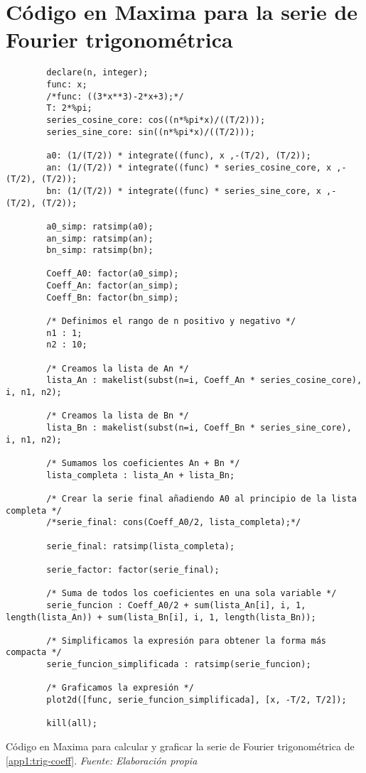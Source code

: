 \section{Código en Maxima para la serie de Fourier trigonométrica}\label{app2:trig-code-maxima}
\begin{longlisting}
	\begin{verbatim}
		declare(n, integer);
		func: x;
		/*func: ((3*x**3)-2*x+3);*/
		T: 2*%pi;
		series_cosine_core: cos((n*%pi*x)/((T/2)));
		series_sine_core: sin((n*%pi*x)/((T/2)));
		
		a0: (1/(T/2)) * integrate((func), x ,-(T/2), (T/2));
		an: (1/(T/2)) * integrate((func) * series_cosine_core, x ,-(T/2), (T/2));
		bn: (1/(T/2)) * integrate((func) * series_sine_core, x ,-(T/2), (T/2));
		
		a0_simp: ratsimp(a0);
		an_simp: ratsimp(an);
		bn_simp: ratsimp(bn);
		
		Coeff_A0: factor(a0_simp);
		Coeff_An: factor(an_simp);
		Coeff_Bn: factor(bn_simp);
		
		/* Definimos el rango de n positivo y negativo */
		n1 : 1;
		n2 : 10;
		
		/* Creamos la lista de An */
		lista_An : makelist(subst(n=i, Coeff_An * series_cosine_core), i, n1, n2);
		
		/* Creamos la lista de Bn */
		lista_Bn : makelist(subst(n=i, Coeff_Bn * series_sine_core), i, n1, n2);
		
		/* Sumamos los coeficientes An + Bn */
		lista_completa : lista_An + lista_Bn;
		
		/* Crear la serie final añadiendo A0 al principio de la lista completa */
		/*serie_final: cons(Coeff_A0/2, lista_completa);*/
		
		serie_final: ratsimp(lista_completa);
		
		serie_factor: factor(serie_final);
		
		/* Suma de todos los coeficientes en una sola variable */
		serie_funcion : Coeff_A0/2 + sum(lista_An[i], i, 1, length(lista_An)) + sum(lista_Bn[i], i, 1, length(lista_Bn));
		
		/* Simplificamos la expresión para obtener la forma más compacta */
		serie_funcion_simplificada : ratsimp(serie_funcion);
		
		/* Graficamos la expresión */
		plot2d([func, serie_funcion_simplificada], [x, -T/2, T/2]);
		
		kill(all);	
	\end{verbatim}
	\caption[Código en Maxima para calcular y graficar la serie de Fourier trigonométrica de \ref{app1:trig-coeff}.] {Código en Maxima para calcular y graficar la serie de Fourier trigonométrica de \ref{app1:trig-coeff}. \textit{Fuente: Elaboración propia}} 
\end{longlisting}


